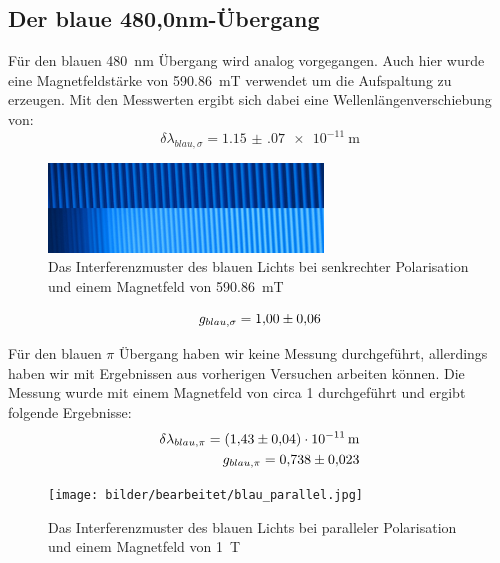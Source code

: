 \subsection{Der blaue 480,0nm-Übergang}
Für den blauen \SI{480}{\nano\metre} Übergang wird analog vorgegangen. 
Auch hier wurde eine Magnetfeldstärke von \SI{590,86}{\milli\tesla} verwendet um die Aufspaltung zu erzeugen.
Mit den Messwerten ergibt sich dabei eine Wellenlängenverschiebung von:
\begin{equation*}
    \delta \lambda_{blau,\sigma} = \SI{1.15(07) e-11}{\metre} 
\end{equation*}

\begin{figure}
    \center
    \includegraphics[width=0.65\textwidth]{bilder/bearbeitet/blau_senk.jpg}
    \caption{Das Interferenzmuster des blauen Lichts bei senkrechter Polarisation und einem Magnetfeld von \SI{590,86}{\milli\tesla}}
    \label{fig:blau_senk}
\end{figure}

\begin{equation*}
    g_{blau,\sigma} = \num{1.00+-0.06}
\end{equation*}



Für den blauen $\pi$ Übergang haben wir keine Messung durchgeführt, allerdings haben wir mit Ergebnissen aus vorherigen Versuchen arbeiten können.
Die Messung wurde mit einem Magnetfeld von circa \SI{1}{\Tesla} durchgeführt und ergibt folgende Ergebnisse:
\begin{align*}
    \delta \lambda_{blau,\pi} = \SI{1.43(04) e-11}{\metre} \\
    g_{blau,\pi} = \num{0.738+-0.023}
\end{align*}

\begin{figure}
    \center
    \texttt{[image: bilder/bearbeitet/blau\_parallel.jpg]}
    \caption{Das Interferenzmuster des blauen Lichts bei paralleler Polarisation und einem Magnetfeld von \SI{1}{\tesla}}
    \label{fig:blau_parallel}
\end{figure}
